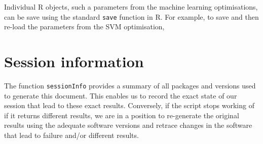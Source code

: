 Individual R objects, such a parameters from the machine learning
optimisations, can be save using the standard \texttt{save} function in
R. For example, to save and then re-load the parameters from the SVM
optimisation,

\begin{Shaded}
\begin{Highlighting}[]
 \NormalTok{)}

\NormalTok{(} \NormalTok{)}
\end{Highlighting}
\end{Shaded}

\section{Session information}\label{session-information}

The function \texttt{sessionInfo} provides a summary of all packages and
versions used to generate this document. This enables us to record the
exact state of our session that lead to these exact results. Conversely,
if the script stops working of if it returns different results, we are
in a position to re-generate the original results using the adequate
software versions and retrace changes in the software that lead to
failure and/or different results.

\begin{Shaded}
\begin{Highlighting}[]
\NormalTok{()}
\end{Highlighting}
\end{Shaded}

